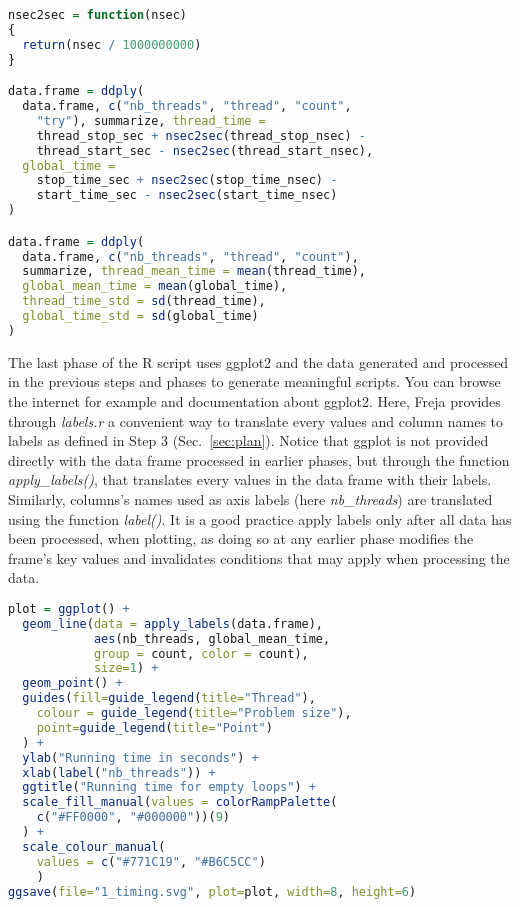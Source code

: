 \begin{lstlisting}[caption={R code to convert the time format returned by calls to clock\_gettime() into single numeric values in seconds, and computation of average and standard deviations of global and per-thread execution time.},label={lst:r_process},language=r]
nsec2sec = function(nsec)
{
  return(nsec / 1000000000)
}

data.frame = ddply(
  data.frame, c("nb_threads", "thread", "count",
  	"try"), summarize, thread_time = 
    thread_stop_sec + nsec2sec(thread_stop_nsec) -
    thread_start_sec - nsec2sec(thread_start_nsec),
  global_time = 
    stop_time_sec + nsec2sec(stop_time_nsec) -
    start_time_sec - nsec2sec(start_time_nsec)
)

data.frame = ddply(
  data.frame, c("nb_threads", "thread", "count"),
  summarize, thread_mean_time = mean(thread_time),
  global_mean_time = mean(global_time),
  thread_time_std = sd(thread_time),
  global_time_std = sd(global_time)
)
\end{lstlisting}

The last phase of the R script uses ggplot2 and the data generated and processed in the previous steps and phases to generate meaningful scripts. You can browse the internet for example and documentation about ggplot2. Here, Freja provides through \emph{labels.r} a convenient way to translate every values and column names to labels as defined in Step 3 (Sec.~\ref{sec:plan}). Notice that ggplot is not provided directly with the data frame processed in earlier phases, but through the function \emph{apply\_labels()}, that translates every values in the data frame with their labels. Similarly, columns's names used as axis labels (here \emph{nb\_threads}) are translated using the function \emph{label()}. It is a good practice apply labels only after all data has been processed, when plotting, as doing so at any earlier phase modifies the frame's key values and invalidates conditions that may apply when processing the data.

\begin{lstlisting}[caption={Use of ggplots to produce a simple dotted curve showing the execution time as a function of number of threads, for problem sizes ranging from $10^8$ to $20^8$ jumps.},label={lst:r_plot},language=r]
plot = ggplot() +
  geom_line(data = apply_labels(data.frame),
            aes(nb_threads, global_mean_time,
            group = count, color = count),
            size=1) +
  geom_point() +
  guides(fill=guide_legend(title="Thread"),
  	colour = guide_legend(title="Problem size"),
  	point=guide_legend(title="Point")
  ) +
  ylab("Running time in seconds") +
  xlab(label("nb_threads")) +
  ggtitle("Running time for empty loops") + 
  scale_fill_manual(values = colorRampPalette(
  	c("#FF0000", "#000000"))(9)
  ) +
  scale_colour_manual(
  	values = c("#771C19", "#B6C5CC")
  	)
ggsave(file="1_timing.svg", plot=plot, width=8, height=6)
\end{lstlisting}

